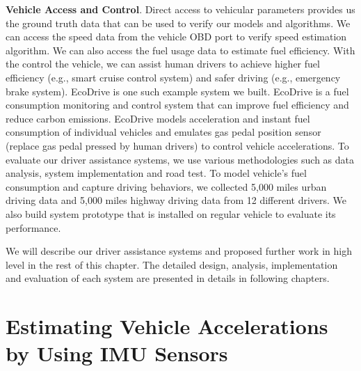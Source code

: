 \textbf{Vehicle Access and Control}. 
Direct access to vehicular parameters provides us the ground truth data
that can be used to verify our models and algorithms. 
We can access the speed data from the vehicle OBD 
port to verify speed estimation algorithm. 
We can also access the fuel usage data to estimate 
fuel efficiency. 
With the control the vehicle, we can assist human drivers to 
achieve higher fuel efficiency (e.g., smart cruise control system) 
and safer driving (e.g., emergency brake system). 
EcoDrive is one such example system we built. 
EcoDrive is a fuel consumption monitoring and control system that can  
improve fuel efficiency and reduce carbon emissions. 
EcoDrive models acceleration and instant fuel consumption of individual vehicles
and emulates gas pedal position sensor 
(replace gas pedal pressed by human drivers) to control vehicle accelerations. 
To evaluate our driver assistance systems, we use various methodologies such as 
data analysis, system implementation and road test. 
To model vehicle's fuel consumption and capture driving behaviors,
we collected 5,000 miles urban driving data and 5,000 miles highway
driving data from 12 different drivers. 
We also build system prototype that is installed
on regular vehicle to evaluate its performance. 




We will describe our driver assistance
systems and proposed further work in high level 
in the rest of this chapter. 
The detailed design, analysis, implementation and evaluation of 
each system are presented in details in following chapters. 


\section{Estimating Vehicle Accelerations by Using IMU Sensors}


